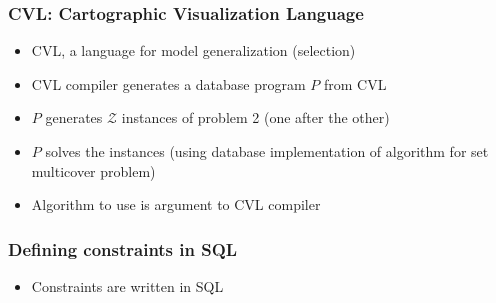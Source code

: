 \documentclass{beamer}
\begin{document}
\frame
{
  \frametitle{CVL: Cartographic Visualization Language}
  
  \begin{center}
  \end{center}

  \begin{itemize}
  \item CVL, a language for model generalization (selection)
  \item CVL compiler generates a database program $P$ from CVL
  \item $P$ generates $\mathcal{Z}$ instances of problem 2 (one after the other)
  \item $P$ solves the instances (using database implementation of algorithm for set multicover problem)
  \item Algorithm to use is argument to CVL compiler
  \end{itemize}
}

\frame
{
  \frametitle{Defining constraints in SQL}
  \begin{itemize}
  \item Constraints are written in SQL
  \end{itemize}
}
\end{document}
